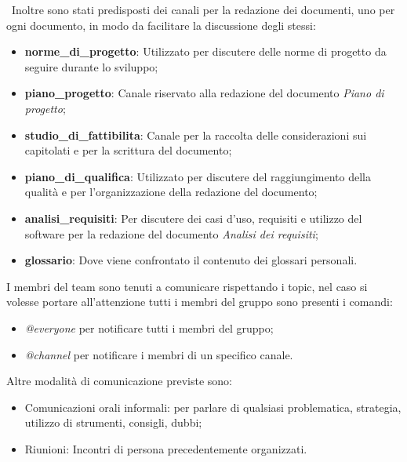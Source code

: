                 ~\newline Inoltre sono stati predisposti dei canali per la redazione dei documenti, uno per ogni documento, in modo da facilitare la discussione degli stessi:
                \begin{itemize}
                    \item \textbf{norme\_di\_progetto}: Utilizzato per discutere delle norme di progetto da seguire durante lo sviluppo;
                    \item \textbf{piano\_progetto}: Canale riservato alla redazione del documento \textit{Piano di progetto};
                    \item \textbf{studio\_di\_fattibilita}: Canale per la raccolta delle considerazioni sui capitolati e per la scrittura del documento;
                    \item \textbf{piano\_di\_qualifica}: Utilizzato per discutere del raggiungimento della qualità e per l'organizzazione della redazione del documento;
                    \item \textbf{analisi\_requisiti}: Per discutere dei casi d'uso, requisiti e utilizzo del software per la redazione del documento \textit{Analisi dei requisiti}; 
                    \item \textbf{glossario}: Dove viene confrontato il contenuto dei glossari personali.
                \end{itemize}
                
                I membri del team sono tenuti a comunicare rispettando i topic, nel caso si volesse portare all'attenzione tutti i membri del gruppo sono presenti i comandi:
                \begin{itemize}
                    \item \textit{@everyone} per notificare tutti i membri del gruppo;
                    \item \textit{@channel} per notificare i membri di un specifico canale.
                \end{itemize}
                
              
                Altre modalità di comunicazione previste sono:
                \begin{itemize}
                    \item Comunicazioni orali informali: per parlare di qualsiasi problematica, strategia, utilizzo di strumenti, consigli, dubbi;
                    \item Riunioni: Incontri di persona precedentemente organizzati.
                \end{itemize}        
